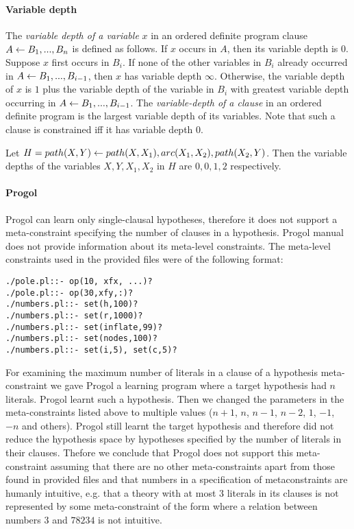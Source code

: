 \paragraph{Variable depth}
\begin{defn}\label{definition_variable_depth}\cite{nienhuys1997foundations}
The \emph{variable depth of a variable} $x$ in an ordered definite program clause
$A \leftarrow  B_1, . . . , B_n$ is defined as follows. If $x$ occurs in $A$, then its variable depth is $0$. Suppose $x$ first occurs in $B_i$.
If none of the other variables
in $B_i$ already occurred in $A \leftarrow B_1,... ,B_{i-1}$,
then $x$ has variable depth $\infty$.
Otherwise, the variable depth of $x$ is $1$ plus the variable depth of the variable in $B_i$ with greatest variable depth occurring in
$A \leftarrow B_1,... ,B_{i-1}$.
The \emph{variable-depth of a clause} in an ordered definite program
is the largest variable depth of its variables. Note that such a
clause is constrained iff it has variable depth $0$.
\end{defn}

\begin{exmp}
Let $H=path(X,Y) \leftarrow path(X,X_1), arc(X_1,X_2), path(X_2,Y)$.
Then the variable depths of the variables $X,Y,X_1,X_2$ in $H$ are
$0,0,1,2$ respectively.
\end{exmp}

\paragraph{Progol}
Progol can learn only single-clausal hypotheses\cite{muggleton2012mc}, therefore it does not support a meta-constraint specifying the number of clauses in a hypothesis.
Progol manual does not provide information about its meta-level constraints. The meta-level constraints used in the provided files\cite{muggleton1999progolWebsite} were of the following format:
\begin{lstlisting}
./pole.pl::- op(10, xfx, ...)?
./pole.pl::- op(30,xfy,:)?
./numbers.pl::- set(h,100)?
./numbers.pl::- set(r,1000)?
./numbers.pl::- set(inflate,99)?
./numbers.pl::- set(nodes,100)?
./numbers.pl::- set(i,5), set(c,5)?
\end{lstlisting}
For examining the maximum number of literals in a clause of a hypothesis meta-constraint we gave Progol a learning program where a target hypothesis had $n$ literals. Progol learnt such a hypothesis. Then we changed the parameters in the meta-constraints listed above to multiple values ($n+1$, $n$, $n-1$, $n-2$, $1$, $-1$, $-n$ and others). Progol still learnt the target hypothesis and therefore did not reduce the hypothesis space by hypotheses specified by the number of literals in their clauses. Thefore we conclude that Progol does not support this meta-constraint assuming that there are no other meta-constraints apart from those found in provided files and that numbers in a specification of metaconstraints are humanly intuitive, e.g. that a theory with at most $3$ literals in its clauses is not represented by some meta-constraint of the form  where a relation between numbers $3$ and $78234$ is not intuitive.

